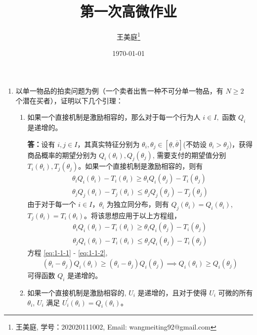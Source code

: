 \documentclass[UTF8]{article} %
\title{
	第一次高微作业
}
\author{王美庭\thanks{王美庭, 学号：202020111002, Email: wangmeiting92@gmail.com}}
\date{\today}
\begin{document}
\maketitle

\begin{enumerate}
    \item 以单一物品的拍卖问题为例（一个卖者出售一种不可分单一物品，有 $N\geq 2$ 个潜在买者），证明以下几个引理：
    \begin{enumerate}
        \item 如果一个直接机制是激励相容的，那么对于每一个行为人 $i \in I,$ 函数 $Q_{i}$ 是递增的。
        
        \textbf{答：}设有 $i,j\in I$，其真实特征分别为 $\theta_i,\theta_j \in [\underline{\theta},\overline{\theta}]$(不妨设 $\theta_i > \theta_j$)，获得商品概率的期望分别为 $Q_i(\theta_i), Q_j(\theta_j)$, 需要支付的期望值分别 $T_i(\theta_i), T_j(\theta_j)$。如果一个直接机制是激励相容的，则有
        \begin{gather*}
            \theta_i Q_i(\theta_i) - T_i(\theta_i) \geq \theta_i Q_i(\theta_j) - T_i(\theta_j)  \\
            \theta_j Q_j(\theta_i) - T_j(\theta_i) \leq \theta_j Q_j(\theta_j) - T_j(\theta_j) 
        \end{gather*}
        由于对于每一个 $i\in I$，$\theta_i$ 为独立同分布，则有 $Q_j(\theta_i)=Q_i(\theta_i)$, $T_j(\theta_i)=T_i(\theta_i)$。将该思想应用于以上方程组，
        \begin{gather}
            \theta_i Q_i(\theta_i) - T_i(\theta_i) \geq \theta_i Q_i(\theta_j) - T_i(\theta_j) \label{eq:1-1-1} \\
            \theta_j Q_i(\theta_i) - T_i(\theta_i) \leq \theta_j Q_i(\theta_j) - T_i(\theta_j) \label{eq:1-1-2}
        \end{gather}
        方程 \eqref{eq:1-1-1} - \eqref{eq:1-1-2}, 
        \begin{gather*}
            (\theta_i-\theta_j)Q_i(\theta_i) \geq (\theta_i-\theta_j)Q_i(\theta_j) \implies Q_i(\theta_i) \geq Q_i(\theta_j)
        \end{gather*}
        可得函数 $Q_i$ 是递增的。
        
        \item 如果一个直接机制是激励相容的, $U_{i}$ 是递增的，且对于使得 $U_{i}$ 可微的所有 $\theta_i$, $U_{i}$ 满足 $U_{i}^{\prime}\left(\theta_{i}\right)=Q_{i}(\theta_i)$。
        

\end{enumerate}
\end{enumerate}
\end{document}

